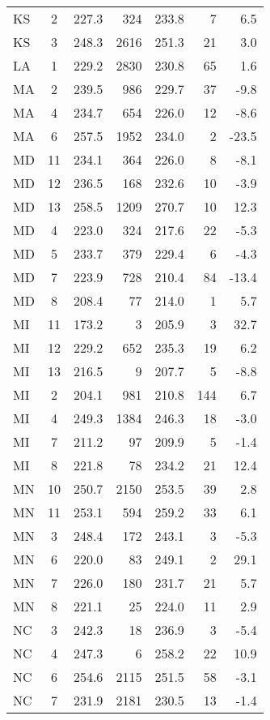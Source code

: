\begin{longtable}{lcrr@{\extracolsep{10pt}}rr@{\extracolsep{10pt}}r}
  KS & 2 & 227.3 & 324 & 233.8 &  7 & 6.5 \\ 
  KS & 3 & 248.3 & 2616 & 251.3 & 21 & 3.0 \\ 
  LA & 1 & 229.2 & 2830 & 230.8 & 65 & 1.6 \\ 
  MA & 2 & 239.5 & 986 & 229.7 & 37 & -9.8 \\ 
  MA & 4 & 234.7 & 654 & 226.0 & 12 & -8.6 \\ 
  MA & 6 & 257.5 & 1952 & 234.0 &  2 & -23.5 \\ 
  MD & 11 & 234.1 & 364 & 226.0 &  8 & -8.1 \\ 
  MD & 12 & 236.5 & 168 & 232.6 & 10 & -3.9 \\ 
  MD & 13 & 258.5 & 1209 & 270.7 & 10 & 12.3 \\ 
  MD & 4 & 223.0 & 324 & 217.6 & 22 & -5.3 \\ 
  MD & 5 & 233.7 & 379 & 229.4 &  6 & -4.3 \\ 
  MD & 7 & 223.9 & 728 & 210.4 & 84 & -13.4 \\ 
  MD & 8 & 208.4 & 77 & 214.0 &  1 & 5.7 \\ 
  MI & 11 & 173.2 &  3 & 205.9 &  3 & 32.7 \\ 
  MI & 12 & 229.2 & 652 & 235.3 & 19 & 6.2 \\ 
  MI & 13 & 216.5 &  9 & 207.7 &  5 & -8.8 \\ 
  MI & 2 & 204.1 & 981 & 210.8 & 144 & 6.7 \\ 
  MI & 4 & 249.3 & 1384 & 246.3 & 18 & -3.0 \\ 
  MI & 7 & 211.2 & 97 & 209.9 &  5 & -1.4 \\ 
  MI & 8 & 221.8 & 78 & 234.2 & 21 & 12.4 \\ 
  MN & 10 & 250.7 & 2150 & 253.5 & 39 & 2.8 \\ 
  MN & 11 & 253.1 & 594 & 259.2 & 33 & 6.1 \\ 
  MN & 3 & 248.4 & 172 & 243.1 &  3 & -5.3 \\ 
  MN & 6 & 220.0 & 83 & 249.1 &  2 & 29.1 \\ 
  MN & 7 & 226.0 & 180 & 231.7 & 21 & 5.7 \\ 
  MN & 8 & 221.1 & 25 & 224.0 & 11 & 2.9 \\ 
  NC & 3 & 242.3 & 18 & 236.9 &  3 & -5.4 \\ 
  NC & 4 & 247.3 &  6 & 258.2 & 22 & 10.9 \\ 
  NC & 6 & 254.6 & 2115 & 251.5 & 58 & -3.1 \\ 
  NC & 7 & 231.9 & 2181 & 230.5 & 13 & -1.4 \\ 

\end{longtable}
